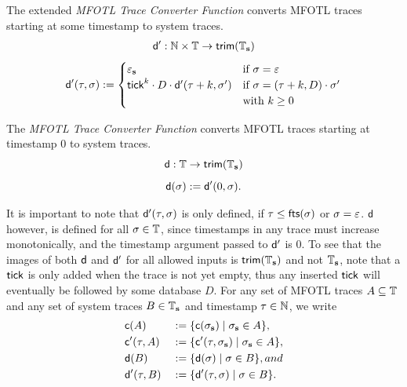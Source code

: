 \begin{definition}
    \label{def:dconv'}
    The extended \emph{MFOTL Trace Converter Function}
    converts MFOTL
    traces starting at some timestamp to system traces.
    \vspace{-1em}
    \begin{align*}
        \mathsf{d}':
        \mathbb{N} \times \mathbb{T} \to \mathsf{trim}(\mathbb{T}_{\mathbf{s}})
    \end{align*}
    \vspace{-2em}
    \begin{align*}
        \label{eq:dconv'}
        \mathsf{d}'(\tau, \sigma) :=
        \begin{cases}
            \varepsilon_{\mathbf{s}}
                &\text{if } \sigma = \varepsilon \\
            \mathsf{tick}^k \cdot D \cdot \mathsf{d}'(\tau+k, \sigma')
                &\text{if } \sigma = (\tau+k, D) \cdot \sigma' \\
                &\text{with } k \geq 0
        \end{cases}
    \end{align*}
\end{definition}

\begin{definition}
    \label{def:dconv}
    The \emph{MFOTL Trace Converter Function} converts MFOTL
    traces starting at timestamp $0$ to system traces.
    \vspace{-1em}
    \begin{equation*}
        \mathsf{d}: \mathbb{T} \to \mathsf{trim}(\mathbb{T}_{\mathbf{s}})
    \end{equation*}
    \vspace{-2em}
    \begin{equation*}
        \label{eq:dconv}
        \mathsf{d}(\sigma) := \mathsf{d}'(0, \sigma).
    \end{equation*}
\end{definition}

It is important to note that $\mathsf{d}'(\tau, \sigma)$
is only defined, if
$\tau \leq \mathsf{fts}(\sigma)$ or $\sigma = \varepsilon$.
$\mathsf{d}$ however, is defined for all $\sigma \in \mathbb{T}$,
since timestamps in any trace must increase monotonically,
and the timestamp argument passed to $\mathsf{d}'$ is $0$.
To see that the images of both $\mathsf{d}$ and $\mathsf{d}'$
for all allowed inputs is $\mathsf{trim}(\mathbb{T}_{\mathbf{s}})$ and
not $\mathbb{T}_{\mathbf{s}}$, note that a $\mathsf{tick}$ is only added when
the trace is not yet empty, thus any inserted $\mathsf{tick}$ will
eventually be followed by some database $D$.
For any set of MFOTL traces $A \subseteq \mathbb{T}$ and any
set of system traces $B \in \mathbb{T}_{\mathbf{s}}$ and timestamp
$\tau \in \mathbb{N}$, we write
\begin{align*}
    &\mathsf{c}(A) &&:= \{ \mathsf{c}(\sigma_{\mathbf{s}}) \mid \sigma_{\mathbf{s}} \in A \}, \\
    &\mathsf{c}'(\tau, A) &&:= \{ \mathsf{c}'(\tau, \sigma_{\mathbf{s}}) \mid \sigma_{\mathbf{s}} \in A \}, \\
    &\mathsf{d}(B) &&:= \{ \mathsf{d}(\sigma) \mid \sigma \in B \}, and \\
    &\mathsf{d}'(\tau, B) &&:= \{ \mathsf{d}'(\tau, \sigma) \mid \sigma \in B \}. \\
\end{align*}

